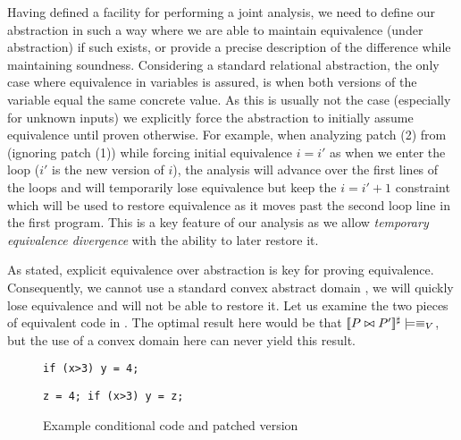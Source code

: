 

Having defined a facility for performing a joint analysis, we need to define our abstraction in such a way where we
are able to maintain equivalence (under abstraction) if such exists, or provide a precise description of the difference while maintaining soundness. Considering a standard relational abstraction, the only case where equivalence in variables is assured, is when both versions of the variable equal the same concrete value. As this is usually not the case (especially for unknown inputs) we explicitly force the abstraction to initially assume equivalence until proven otherwise. For example, when analyzing patch (2) from  (ignoring patch (1)) while forcing initial equivalence ${i = i'}$ as when we enter the loop ($i'$ is the new version of $i$), the analysis will advance over the first lines of the loops and will temporarily lose equivalence but keep the ${i = i' + 1}$ constraint which will be used to restore equivalence as it moves past the second loop line in the first program. This is a key feature of our analysis as we allow \emph{temporary equivalence divergence} with the ability to later restore it.


As stated, explicit equivalence over abstraction is key for proving equivalence. Consequently, we cannot use a standard convex abstract domain \cite{JeannetMine09}, we will quickly lose equivalence and will not be able to restore it. Let us examine the two pieces of equivalent code in . The optimal result here would be that $\lbrack\!\lbrack P \bowtie P' \rbrack\!\rbrack^{\sharp} \models \equiv_{V}$, but the use of a convex domain here can never yield this result.

\begin{figure}[ht]
 \centering
\begin{lstlisting}
if (x>3) y = 4;
\end{lstlisting}
\hspace{0.5cm} \centering
\begin{lstlisting}
z = 4; if (x>3) y = z;
\end{lstlisting}
\caption{Example conditional code and patched version}
\end{figure}

